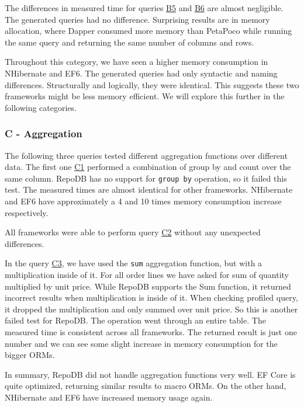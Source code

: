 The differences in measured time for queries \hyperref[query:b5]{B5} and \hyperref[query:b6]{B6} are almost negligible. The generated queries had no difference. Surprising results are in memory allocation, where Dapper consumed more memory than PetaPoco while running the same query and returning the same number of columns and rows.

Throughout this category, we have seen a higher memory consumption in NHibernate and EF6. The generated queries had only syntactic and naming differences. Structurally and logically, they were identical. This suggests these two frameworks might be less memory efficient. We will explore this further in the following categories.

\subsubsection{C - Aggregation}
The following three queries tested different aggregation functions over different data. The first one \hyperref[query:c1]{C1} performed a combination of group by and count over the same column. RepoDB has no support for \texttt{group by} operation, so it failed this test. The measured times are almost identical for other frameworks. NHibernate and EF6 have approximately a 4 and 10 times memory consumption increase respectively.

All frameworks were able to perform query \hyperref[query:c2]{C2} without any unexpected differences.

In the query \hyperref[query:c3]{C3}, we have used the \texttt{sum} aggregation function, but with a multiplication inside of it. For all order lines we have asked for sum of quantity multiplied by unit price. While RepoDB supports the Sum function, it returned incorrect results when multiplication is inside of it. When checking profiled query, it dropped the multiplication and only summed over unit price. So this is another failed test for RepoDB.
The operation went through an entire table. The measured time is consistent across all frameworks. The returned result is just one number and we can see some slight increase in memory consumption for the bigger ORMs.

In summary, RepoDB did not handle aggregation functions very well. EF Core is quite optimized, returning similar results to macro ORMs. On the other hand, NHibernate and EF6 have increased memory usage again.



